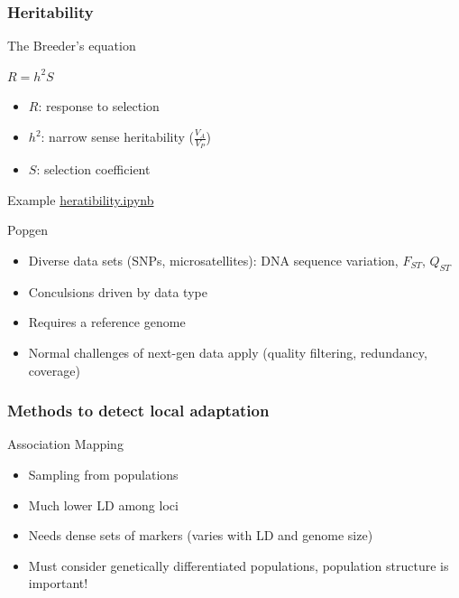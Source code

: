 \begin{frame}
\frametitle{Heritability}
\begin{block}{The Breeder's equation}
\begin{center}
\huge
$R = h^2S$
\end{center}
\begin{itemize}
\item[]{$R$: response to selection}
\item[]{$h^2$: narrow sense heritability ($\frac{V_A}{V_P}$)}
\item[]{$S$: selection coefficient}
\end{itemize}
\end{block}

\begin{block}{Example}
\href{http://localhost:8888/notebooks/heritability.ipynb}{heratibility.ipynb}
\end{block}
\end{frame}





\begin{frame}
\begin{block}{Popgen}
\begin{itemize}
\item{Diverse data sets (SNPs, microsatellites): DNA sequence variation,
$F_{ST}$, $Q_{ST}$}
\item{Conculsions driven by data type}
\item{Requires a reference genome}
\item{Normal challenges of next-gen data apply (quality filtering, redundancy,
coverage)}
\end{itemize}
\end{block}
\end{frame}

\begin{frame}
\frametitle{Methods to detect local adaptation}
\begin{block}{Association Mapping}
\begin{itemize}
\item{Sampling from populations}
\item{Much lower LD among loci}
\item{Needs dense sets of markers (varies with LD and genome size)}
\item{Must consider genetically differentiated populations, population
structure is important!}
\end{itemize}
\end{block}
\end{frame}

